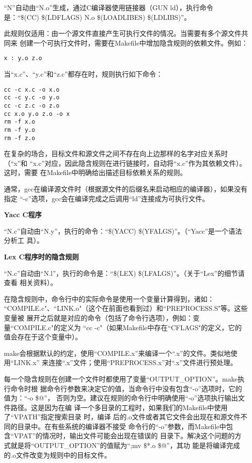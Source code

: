 \begin{dinglist}{47}
“N”自动由“N.o”生成，通过C编译器使用链接器（GUN ld），执行命令是：“\$(CC)
\$(LDFLAGS) N.o \$(LOADLIBES) \$(LDLIBS)”。

此规则仅适用：由一个源文件直接产生可执行文件的情况。当需要有多个源文件共同来
创建一个可执行文件时，需要在Makefile中增加隐含规则的依赖文件。例如：

\begin{Verbatim}[]
x : y.o z.o
\end{Verbatim}

当“x.c”、“y.c”和“z.c”都存在时，规则执行如下命令：
\begin{Verbatim}[]
cc -c x.c -o x.o
cc -c y.c -o y.o
cc -c z.c -o z.o
cc x.o y.o z.o -o x
rm -f x.o
rm -f y.o
rm -f z.o
\end{Verbatim}

在复杂的场合，目标文件和源文件之间不存在向上边那样的名字对应关系时（“x”和
“x.c”对应，因此隐含规则在进行链接时，自动将“x.c”作为其依赖文件）。这时，需要
在Makefile中明确给出描述目标依赖关系的规则。

通常，gcc在编译源文件时（根据源文件的后缀名来启动相应的编译器），如果没有指定
“-c”选项，gcc会在编译完成之后调用“ld”连接成为可执行文件。

\item \textbf{Yacc C程序}

“N.c”自动由“N.y”，执行的命令：“\$(YACC) \$(YFALGS)”。（“Yacc”是一个语法分析工
具）。

\item \textbf{Lex C程序时的隐含规则}

“N.c”自动由“N.l”，执行的命令是：“\$(LEX) \$(LFALGS)”。（关于“Lex”的细节请查看
相关资料）。


\end{dinglist}

在隐含规则中，命令行中的实际命令是使用一个变量计算得到，诸如：
``COMPILE.c"、``LINK.o"（这个在前面也看到过）和``PREPROCESS.S"等。这些变量被
展开之后就是对应的命令（包括了命令行选项），例如：变量``COMPILE.c"的定义为
``cc -c"（如果Makefile中存在``CFLAGS"的定义，它的值会存在于这个变量中）。

make会根据默认的约定，使用“COMPILE.x”来编译一个“.x”的文件。类似地使用“LINK.x”
来连接“.x”文件；使用“PREPROCESS.x”对“.x”文件进行预处理。

每一个隐含规则在创建一个文件时都使用了变量“OUTPUT\_OPTION”。make执行命令时根
据命令行参数来决定它的值，当命令行中没有包含“-o”选项时，它的值为：“-o \$@”，
否则为空。建议在规则的命令行中明确使用“-o”选项执行输出文件路径。这是因为在编
译一个多目录的工程时，如果我们的Makefile中使用了“VPATH”指定搜索目录 时，编译
后的.o文件或者其它文件会出现在和源文件不同的目录中。在有些系统的编译器不接受
命令行的“-o”参数，而Makefile中包含“VPAT”的情况时，输出文件可能会出现在错误的
目录下。解决这个问题的方式就是将“OUTPUT\_OPTION”的值赋为“;mv \$*.o \$@”，其功
能是将编译完成的.o文件改变为规则中的目标文件。

